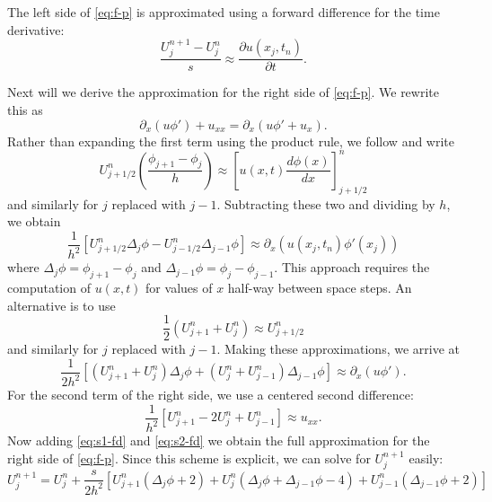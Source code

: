 \documentclass[reqno,11pt]{article}
\begin{document}
	The left side of \eqref{eq:f-p} is approximated using a forward difference for the time derivative:
	\begin{equation}
		\label{eq:t-fd}
		\frac{U_j^{n+1} - U_j^n}{s} \approx \frac{\partial u (x_j,t_n)}{\partial t}.
	\end{equation}
	
	Next will we derive the approximation for the right side of \eqref{eq:f-p}.
	We rewrite this as
	\begin{equation*}
		\partial_x (u \phi') + u_{xx} = \partial_x (u \phi' + u_x).
	\end{equation*}
	Rather than expanding the first term using the product rule, we follow \cite{morton_mayers_2005} and write
	\begin{equation*}
		U_{j+1/2}^n \left( \frac{ \phi_{j+1} - \phi_j}{h} \right) \approx \left[ u (x,t) \frac{d \phi (x)}{dx} \right]_{j+1/2}^n
	\end{equation*}
	and similarly for $j$ replaced with $j-1$.
	Subtracting these two and dividing by $h$, we obtain
	\begin{equation*}
		\frac{1}{h^2} \left[ U_{j+1/2}^n \Delta_j \phi - U_{j-1/2}^n \Delta_{j-1} \phi \right] \approx \partial_x \left( u (x_j,t_n) \phi' (x_j) \right)
	\end{equation*}
	where $\Delta_j \phi = \phi_{j+1} - \phi_j$ and $\Delta_{j-1} \phi = \phi_j - \phi_{j-1}$.
	This approach requires the computation of $u (x,t)$ for values of $x$ half-way between space steps.
	An alternative is to use
	\begin{equation*}
		\frac{1}{2} \left( U_{j+1}^n + U_j^n \right) \approx U_{j+1/2}^n
	\end{equation*}
	and similarly for $j$ replaced with $j-1$.
	Making these approximations, we arrive at
	\begin{equation}
		\label{eq:s1-fd}
		\frac{1}{2 h^2} \left[ ( U_{j+1}^n + U_j^n ) \Delta_j \phi + ( U_j^n + U_{j-1}^n ) \Delta_{j-1} \phi \right] \approx \partial_x (u \phi').
	\end{equation}
	For the second term of the right side, we use a centered second difference:
	\begin{equation}
		\label{eq:s2-fd}
		\frac{1}{h^2} \left[ U_{j+1}^n - 2 U_j^n + U_{j-1}^n \right] \approx u_{xx}.
	\end{equation}
	Now adding \eqref{eq:s1-fd} and \eqref{eq:s2-fd} we obtain the full approximation for the right side of \eqref{eq:f-p}.
	Since this scheme is explicit, we can solve for $U_j^{n+1}$ easily:
	\begin{equation}
		\label{eq:fd-scheme}
		U_j^{n+1} = U_j^n + \frac{s}{2 h^2} \left[ U_{j+1}^n ( \Delta_j \phi + 2 ) + U_j^n ( \Delta_j \phi + \Delta_{j-1} \phi - 4 ) + U_{j-1}^n ( \Delta_{j-1} \phi + 2 ) \right]
	\end{equation}
	
\end{document}
